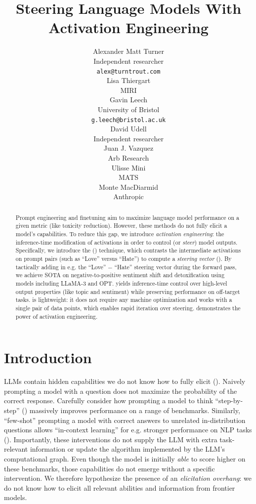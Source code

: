 \documentclass{article}
\title{Steering Language Models With Activation Engineering}
\author{%
  Alexander Matt Turner \\
  Independent researcher\\
  \texttt{alex@turntrout.com} \\
  \And
  Lisa Thiergart \\
  MIRI \\
  \And
  Gavin Leech \\
  University of Bristol \\
  \texttt{g.leech@bristol.ac.uk} \\
  \AND
  David Udell\\
  Independent researcher \\
  \And
  Juan J. Vazquez \\
  Arb Research \\
  \And
  Ulisse Mini\\
  MATS \\
  \And
  Monte MacDiarmid \\
  Anthropic \\
}
\newcommand{\method}{\text{Activation Addition}}
\newcommand{\shortmethod}{\text{ActAdd}}
\theoremstyle{plain}
\theoremstyle{definition}
\theoremstyle{remark}
\begin{document}
\maketitle


\begin{abstract}
Prompt engineering and finetuning aim to maximize language model performance on a given metric (like toxicity reduction). However, these methods do not fully elicit a model’s capabilities.  To reduce this gap, we introduce \emph{activation engineering}: the inference-time modification of activations in order to control (or \emph{steer}) model outputs. Specifically, we introduce the \emph{\method} (\shortmethod) technique, which contrasts the intermediate activations on prompt pairs (such as “Love” versus “Hate”) to compute a \emph{steering vector} (\citep{subramani-2022-extracting}). By tactically adding in e.g. the “Love” $-$ “Hate” steering vector during the forward pass, we achieve SOTA on negative-to-positive sentiment shift and detoxification using models including LLaMA-3 and OPT. {\shortmethod} yields inference-time control over high-level output properties (like topic and sentiment) while preserving performance on off-target tasks. {\shortmethod} is lightweight: it does not require any machine optimization and works with a single pair of data points, which enables rapid iteration over steering. {\shortmethod} demonstrates the power of activation engineering.
\end{abstract}


\section{Introduction}\label{sec:intro}

LLMs contain hidden capabilities we do not know how to fully elicit (\citep{korinek2023language}). Naively prompting a model with a question does not maximize the probability of the correct response.  Carefully consider how prompting a model to think ``step-by-step'' (\citep{wei2022chain}) massively improves performance on a range of benchmarks. Similarly, ``few-shot'' prompting a model with correct answers to unrelated in-distribution questions allows ``in-context learning'' for e.g. stronger performance on NLP tasks (\citep{brown2020language}). Importantly, these interventions do not supply the LLM with extra task-relevant information or update the algorithm implemented by the LLM's computational graph. Even though the model is initially \emph{able} to score higher on these benchmarks, those capabilities do not emerge without a specific intervention. We therefore hypothesize the presence of an \emph{elicitation overhang}: we do not know how to elicit all relevant abilities and information from frontier models.
\end{document}
